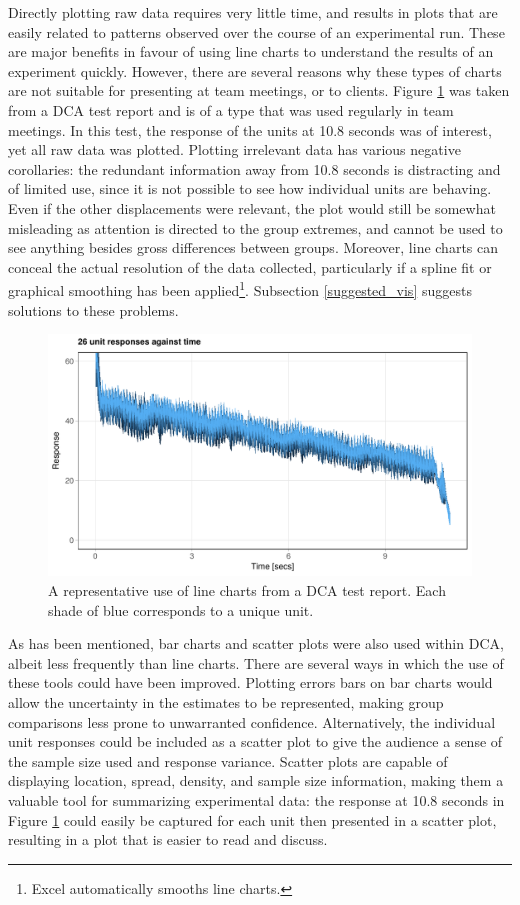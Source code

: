 \documentclass[11pt,a4paper,article]{memoir} %
\begin{document}
Directly plotting raw data requires very little time, and results in plots that are easily related to patterns observed over the course of an experimental run. These are major benefits in favour of using line charts to understand the results of an experiment quickly. However, there are several reasons why these types of charts are not suitable for presenting at team meetings, or to clients. Figure \ref{fig:line_chart} was taken from a DCA test report and is of a type that was used regularly in team meetings. In this test, the response of the units at 10.8 seconds was of interest, yet all raw data was plotted. Plotting irrelevant data has various negative corollaries: the redundant information away from 10.8 seconds is distracting and of limited use, since it is not possible to see how individual units are behaving.  Even if the other displacements were relevant, the plot would still be somewhat misleading as attention is directed to the group extremes, and cannot be used to see anything besides gross differences between groups. Moreover, line charts can conceal the actual resolution of the data collected, particularly if a spline fit or graphical smoothing has been applied\footnote{Excel automatically smooths line charts.}. Subsection \ref{suggested_vis} suggests solutions to these problems.
\begin{figure}[h!]
\includegraphics[width=\textwidth]{imitation_line_chart_2.pdf}
\caption{A representative use of line charts from a DCA test report. Each shade of blue corresponds to a unique unit.}
\label{fig:line_chart}
\end{figure}

As has been mentioned, bar charts and scatter plots were also used within DCA, albeit less frequently than line charts. There are several ways in which the use of these tools could have been improved. Plotting errors bars on bar charts would allow the uncertainty in the estimates to be represented, making group comparisons less prone to unwarranted confidence. Alternatively, the individual unit responses could be included as a scatter plot to give the audience a sense of the sample size used and response variance. Scatter plots are capable of displaying location, spread, density, and sample size information, making them a valuable tool for summarizing experimental data: the response at 10.8 seconds in Figure \ref{fig:line_chart} could easily be captured for each unit then presented in a scatter plot, resulting in a plot that is easier to read and discuss.
\end{document}

